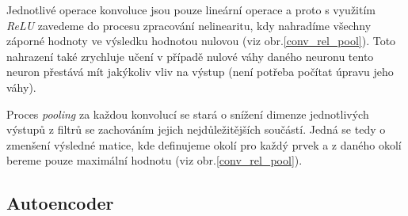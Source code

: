 \documentclass[12pt]{article}
\begin{document}
Jednotlivé operace konvoluce jsou pouze lineární operace a proto s využitím \textit{ReLU} zavedeme do procesu zpracování nelinearitu, kdy nahradíme všechny záporné hodnoty ve výsledku hodnotou nulovou (viz obr.\ref{conv_rel_pool}). Toto nahrazení také zrychluje učení v případě nulové váhy daného neuronu tento neuron přestává mít jakýkoliv vliv na výstup (není potřeba počítat úpravu jeho váhy).

Proces \textit{pooling} za každou konvolucí se stará o snížení dimenze jednotlivých výstupů z filtrů se zachováním jejich nejdůležitějších součástí. Jedná se tedy o zmenšení výsledné matice, kde definujeme okolí pro každý prvek a z daného okolí bereme pouze maximální hodnotu (viz obr.\ref{conv_rel_pool}).

\subsection{Autoencoder}
\end{document}
